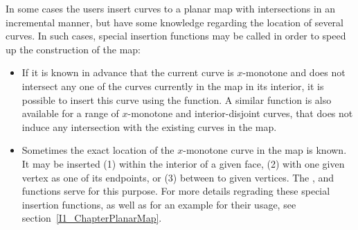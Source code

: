In some cases the users insert curves to a planar map with intersections
in an incremental manner, but have some knowledge regarding the location
of several curves. In such cases, special insertion functions may be called
in order to speed up the construction of the map:
\begin{itemize}
\item If it is known in advance that the current curve is $x$-monotone and does
not intersect any one of the curves currently in the map in its interior,
it is possible to insert this curve using the 
function. A similar function is also available for a range of $x$-monotone
and interior-disjoint curves, that does not induce any intersection with the
existing curves in the map.
\item Sometimes the exact location of the $x$-monotone curve in the map is known. It may be inserted (1) within the interior of a given face, (2) with one given vertex as one of its endpoints, or (3) between to given vertices. The ,  and  functions serve for this purpose. For more details regrading these special insertion functions, as well as for an example for their usage, see section~\ref{I1_ChapterPlanarMap}.
\end{itemize}

